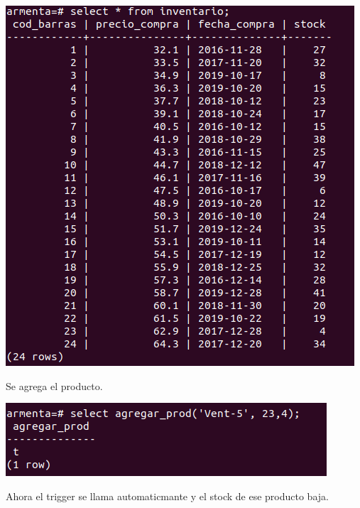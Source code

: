 \documentclass[12pt, letterpaper]{article}     %
\begin{document}
		\begin{center}
 	  	\includegraphics[scale=0.5]{inventario_prev}
		\end{center}
	
		Se agrega el producto.
						
		\begin{center}
 	  	\includegraphics[scale=0.7]{agregar_prod}
		\end{center}
				
		Ahora el trigger se llama automaticmante y el stock de ese producto baja.		
		
\end{document}
